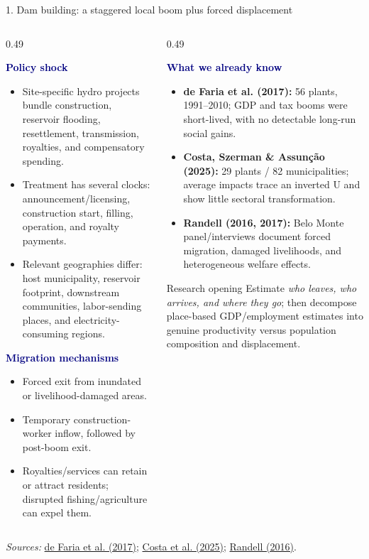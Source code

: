 \documentclass[aspectratio=169,10pt]{beamer}
\newcommand{\ShortSource}[1]{%
  \vfill\par\tiny\color{Muted}\textit{Sources:} #1}
\newcommand{\PolicyTag}[1]{%
  \colorbox{Sand}{\strut\textcolor{Navy}{\textbf{#1}}}}
\begin{document}
\begin{frame}{1. Dam building: a staggered local boom plus forced displacement}
\small
\begin{columns}[T,onlytextwidth]
\begin{column}{0.49\textwidth}
  \PolicyTag{Policy shock}
  \begin{itemize}\setlength\itemsep{0.28em}
    \item Site-specific hydro projects bundle construction, reservoir flooding, resettlement, transmission, royalties, and compensatory spending.
    \item Treatment has several clocks: announcement/licensing, construction start, filling, operation, and royalty payments.
    \item Relevant geographies differ: host municipality, reservoir footprint, downstream communities, labor-sending places, and electricity-consuming regions.
  \end{itemize}
  \vspace{0.2em}
  \PolicyTag{Migration mechanisms}
  \begin{itemize}\setlength\itemsep{0.25em}
    \item Forced exit from inundated or livelihood-damaged areas.
    \item Temporary construction-worker inflow, followed by post-boom exit.
    \item Royalties/services can retain or attract residents; disrupted fishing/agriculture can expel them.
  \end{itemize}
\end{column}
\begin{column}{0.49\textwidth}
  \PolicyTag{What we already know}
  \begin{itemize}\setlength\itemsep{0.28em}
    \item \textbf{de Faria et al. (2017):} 56 plants, 1991--2010; GDP and tax booms were short-lived, with no detectable long-run social gains.
    \item \textbf{Costa, Szerman \& Assunção (2025):} 29 plants / 82 municipalities; average impacts trace an inverted U and show little sectoral transformation.
    \item \textbf{Randell (2016, 2017):} Belo Monte panel/interviews document forced migration, damaged livelihoods, and heterogeneous welfare effects.
  \end{itemize}
  \vspace{0.2em}
  \begin{block}{Research opening}
    Estimate \emph{who leaves, who arrives, and where they go}; then decompose place-based GDP/employment estimates into genuine productivity versus population composition and displacement.
  \end{block}
\end{column}
\end{columns}
\ShortSource{\href{https://doi.org/10.1016/j.eneco.2017.08.025}{de Faria et al. (2017)}; \href{https://doi.org/10.31389/eco.466}{Costa et al. (2025)}; \href{https://doi.org/10.1016/j.worlddev.2016.01.012}{Randell (2016)}.}
\end{frame}
\end{document}

